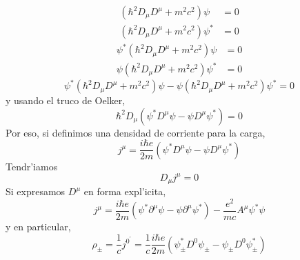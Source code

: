 \begin{align*}
\left(  \hbar^{2}D_{\mu}D^{\mu}+m^{2}c^{2}\right)  \psi & =0\\
\left(  \hbar^{2}D_{\mu}D^{\mu}+m^{2}c^{2}\right)  \psi^{\ast}  & =0
\end{align*}
\begin{align*}
\psi^{\ast}\left(  \hbar^{2}D_{\mu}D^{\mu}+m^{2}c^{2}\right)  \psi & =0\\
\psi\left(  \hbar^{2}D_{\mu}D^{\mu}+m^{2}c^{2}\right)  \psi^{\ast}  & =0
\end{align*}
\begin{equation}
\psi^{\ast}\left(  \hbar^{2}D_{\mu}D^{\mu}+m^{2}c^{2}\right)  \psi
-\psi\left(  \hbar^{2}D_{\mu}D^{\mu}+m^{2}c^{2}\right)  \psi^{\ast}=0
\end{equation}
y usando el truco de Oelker,
\begin{equation}
\hbar^{2}D_{\mu}\left(  \psi^{\ast}D^{\mu}\psi-\psi D^{\mu}\psi^{\ast}\right)
=0
\end{equation}
Por eso, si definimos una densidad de corriente para la carga,
\begin{equation}
j^{\mu}=\frac{i\hbar e}{2m}\left(  \psi^{\ast}D^{\mu}\psi-\psi D^{\mu}%
\psi^{\ast}\right)
\end{equation}
Tendr'iamos
\begin{equation}
D_{\mu}j^{\mu}=0
\end{equation}
Si expresamos $D^{\mu}$ en forma expl'icita,
\begin{equation}
j^{\mu}=\frac{i\hbar e}{2m}\left(  \psi^{\ast}\partial^{\mu}\psi
-\psi\partial^{\mu}\psi^{\ast}\right)  -\frac{e^{2}}{mc}A^{\mu}\psi^{\ast
}\psi
\end{equation}
y en particular,
\begin{equation}
\rho_{\pm}=\frac{1}{c}j^{0^{\prime}}=\frac{1}{c}\frac{i\hbar e}{2m}\left(
\psi_{\pm}^{\ast}D^{0}\psi_{\pm}-\psi_{\pm}D^{0}\psi_{\pm}^{\ast}\right)
\end{equation}


